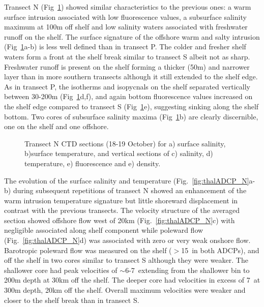 Transect N (Fig~\ref{fig:thalCTD_N}) showed similar
characteristics to the previous ones: a warm surface intrusion
associated with low fluorescence values,  a subsurface salinity
maximum at 100m off shelf and low salinity waters associated with
freshwater runoff on the shelf. The surface signature of the
offshore warm and salty intrusion (Fig~\ref{fig:thalCTD_N}a-b) is
less well defined than in transect P. The colder and fresher shelf
waters form a front at the shelf break similar to transect S
albeit not as sharp. Freshwater runoff is present on the shelf
forming a thicker (50m) and narrower layer than in more southern
transects although it still extended to the shelf edge. As in
transect P, the isotherms and isopycnals on the shelf separated
vertically between 30-200m (Fig~\ref{fig:thalCTD_N}d,f), and again
bottom fluorescence values increased on the shelf edge compared to
transect S (Fig~\ref{fig:thalCTD_N}e), suggesting sinking along
the shelf bottom. Two cores of subsurface salinity maxima
(Fig~\ref{fig:thalCTD_N}b) are clearly discernible, one on the
shelf and one offshore.
\begin{figure}[t]
\arribacap \centering %
\hspace{0.2cm}
\quad%
\subfigure[]{\texttt{[image: N\_S]}}%
\subfigure[]{\texttt{[image: N\_T]}}\quad%
\subfigure[]{\texttt{[image: N\_F]}}%
\subfigure[]{\texttt{[image: N\_D]}}%
\caption{Transect N CTD sections (18-19 October)  for a) surface
salinity, b)surface temperature, and vertical sections of c)
salinity, d) temperature, e) fluorescence and e) density.}
\label{fig:thalCTD_N}
\end{figure}
The evolution of the surface salinity and temperature
(Fig.~\ref{fig:thalADCP_N}a-b) during subsequent repetitions of
transect N showed an enhancement of the warm intrusion temperature
signature but little shoreward displacement in contrast with the
previous transects. The velocity structure of the averaged section
showed offshore flow west of 20km (Fig.~\ref{fig:thalADCP_N}c)
with negligible associated along shelf component while poleward
flow (Fig.~\ref{fig:thalADCP_N}d) was associated with zero or very
weak onshore flow. Barotropic poleward flow was measured on the
shelf ($>$15\velc\, in both ADCPs), and off the shelf in two cores
similar to transect S although they were weaker. The shallower
core had peak velocities of $\sim$6-7\velc\, extending from the
shallower bin to 200m depth at 30km off the shelf. The deeper core
had velocities in excess of 7\velc\, at 300m depth, 20km off the
shelf. Overall maximum velocities were weaker and closer to the
shelf break than in transect S.

